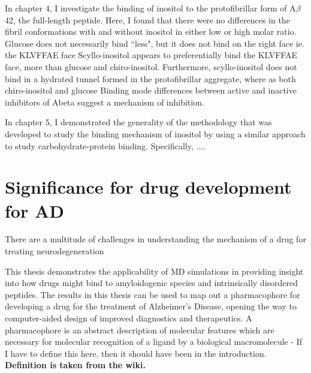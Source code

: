 In chapter 4, I investigate the binding of inositol to the protofibrillar form of A$\beta$42, the full-length peptide. Here, I found that there were no differences in the fibril conformations with and without inositol in either low or high molar ratio. 
Glucose does not necessarily bind ``less", but it does not bind on the right face ie. the KLVFFAE face Scyllo-inositol appears to preferentially bind the KLVFFAE face, more than glucose and chiro-inositol.  Furthermore, scyllo-inositol does not bind in a hydrated tunnel formed in the protofibrillar aggregate, where as both chiro-inositol and glucose Binding mode differences between active and inactive inhibitors of Abeta suggest a mechanism of inhibition.

In chapter 5, I demonstrated the generality of the methodology that was developed to study the binding mechanism of inositol by using a similar approach to study carbohydrate-protein binding. Specifically, ....  

\section{Significance for drug development for AD}

There are a multitude of challenges in understanding the mechanism of a drug for treating neurodegeneration

This thesis demonstrates the applicability of MD simulations in providing insight into how drugs might bind to amyloidogenic species and intrinsically disordered peptides.  The results in this thesis can be used to map out a pharmacophore for developing a drug for the treatment of Alzheimer's Disease, opening the way to computer-aided design of improved diagnostics and therapeutics. A pharmacophore is an abstract description of molecular features which are necessary for molecular recognition of a ligand by a biological macromolecule - If I have to define this here, then it should have been in the introduction. \textbf{Definition is taken from the wiki.}


